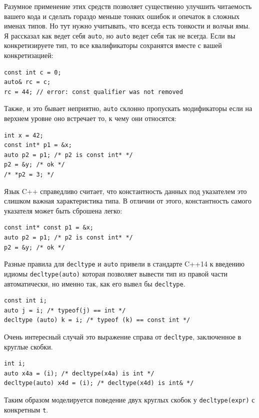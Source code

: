 \documentclass[a4paper,12pt,oneside]{article}
\begin{document}
Разумное применение этих средств позволяет существенно улучшить читаемость вашего кода и сделать гораздо меньше тонких ошибок и опечаток в сложных именах типов. Но тут нужно учитывать, что всегда есть тонкости и волчьи ямы. Я рассказал как ведет себя \lstinline!auto!, но \lstinline!auto! ведет себя так не всегда. Если вы конкретизируете тип, то все квалификаторы сохранятся вместе с вашей конкретизацией:

\begin{lstlisting}
const int c = 0;
auto& rc = c;
rc = 44; // error: const qualifier was not removed
\end{lstlisting}

Также, и это бывает неприятно, \lstinline!auto! склонно пропускать модификаторы если на верхнем уровне оно встречает то, к чему они относятся:

\begin{lstlisting}
int x = 42;
const int* p1 = &x;
auto p2 = p1; /* p2 is const int* */
p2 = &y; /* ok */
/* *p2 = 3; */
\end{lstlisting}

Язык C++ справедливо считает, что константность данных под указателем это слишком важная характеристика типа. В отличии от этого, константность самого указателя может быть сброшена легко:

\begin{lstlisting}
const int* const p1 = &x;
auto p2 = p1; /* p2 is const int* */
p2 = &y; /* ok */
\end{lstlisting}

Разные правила для \lstinline!decltype! и \lstinline!auto! привели в стандарте C++14 к введению идиомы \lstinline!decltype(auto)! которая позволяет вывести тип из правой части автоматически, но именно так, как его вывел бы \lstinline!decltype!.

\begin{lstlisting}
const int i;
auto j = i; /* typeof(j) == int */
decltype (auto) k = i; /* typeof (k) == const int */
\end{lstlisting}

Очень интересный случай это выражение справа от \lstinline!decltype!, заключенное в круглые скобки.

\begin{lstlisting}
int i;
auto x4a = (i); /* decltype(x4a) is int */
decltype(auto) x4d = (i); /* decltype(x4d) is int& */
\end{lstlisting}

Таким образом моделируется поведение двух круглых скобок у \lstinline!decltype(expr)! с конкретным \lstinline!t!.
\end{document}
